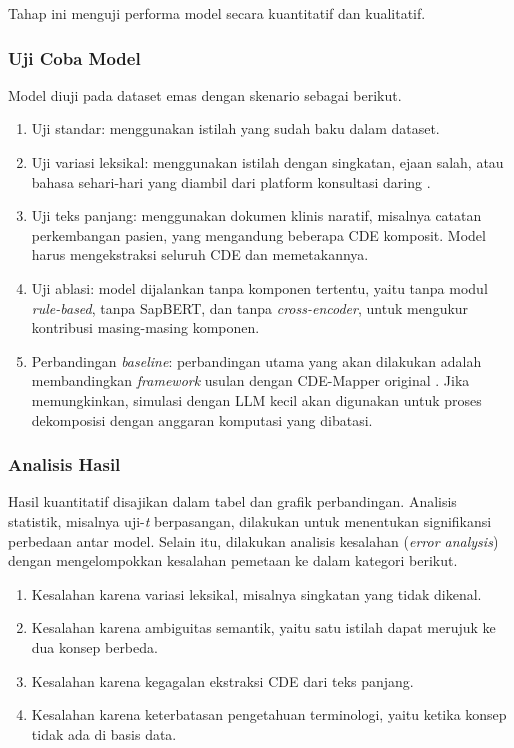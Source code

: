Tahap ini menguji performa model secara kuantitatif dan kualitatif.

\subsubsection{Uji Coba Model}

Model diuji pada dataset emas dengan skenario sebagai berikut.

\begin{enumerate}
    \item Uji standar: menggunakan istilah yang sudah baku dalam dataset.
    \item Uji variasi leksikal: menggunakan istilah dengan singkatan, ejaan salah, atau bahasa sehari-hari yang diambil dari platform konsultasi daring \citep{purwitasari_comparison_2023}.
    \item Uji teks panjang: menggunakan dokumen klinis naratif, misalnya catatan perkembangan pasien, yang mengandung beberapa CDE komposit. Model harus mengekstraksi seluruh CDE dan memetakannya.
    \item Uji ablasi: model dijalankan tanpa komponen tertentu, yaitu tanpa modul \textit{rule-based}, tanpa SapBERT, dan tanpa \textit{cross-encoder}, untuk mengukur kontribusi masing-masing komponen.
    \item Perbandingan \textit{baseline}: perbandingan utama yang akan dilakukan adalah membandingkan \textit{framework} usulan dengan CDE-Mapper original \citep{gilani_cde-mapper_2025}. Jika memungkinkan, simulasi dengan LLM kecil akan digunakan untuk proses dekomposisi dengan anggaran komputasi yang dibatasi.
\end{enumerate}

\subsubsection{Analisis Hasil}

Hasil kuantitatif disajikan dalam tabel dan grafik perbandingan. Analisis statistik, misalnya uji-\textit{t} berpasangan, dilakukan untuk menentukan signifikansi perbedaan antar model. Selain itu, dilakukan analisis kesalahan (\textit{error analysis}) dengan mengelompokkan kesalahan pemetaan ke dalam kategori berikut.

\begin{enumerate}
    \item Kesalahan karena variasi leksikal, misalnya singkatan yang tidak dikenal.
    \item Kesalahan karena ambiguitas semantik, yaitu satu istilah dapat merujuk ke dua konsep berbeda.
    \item Kesalahan karena kegagalan ekstraksi CDE dari teks panjang.
    \item Kesalahan karena keterbatasan pengetahuan terminologi, yaitu ketika konsep tidak ada di basis data.
\end{enumerate}

